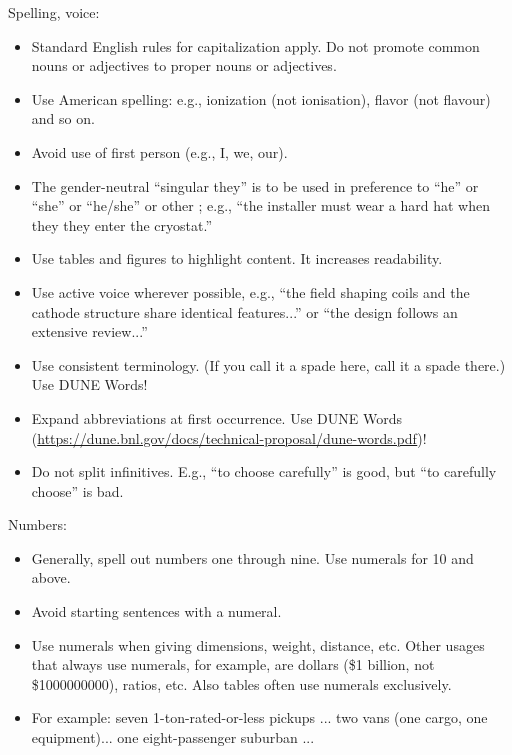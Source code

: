 Spelling, voice:
\begin{itemize}
\item Standard English rules for capitalization apply. Do not promote common nouns or adjectives to proper nouns or adjectives.
\item Use American spelling: e.g., ionization (not ionisation), flavor (not flavour) and so on.
\item Avoid use of first person (e.g., I, we, our). 
\item The gender-neutral ``singular they'' is to be used in preference to ``he'' or ``she'' or ``he/she'' or other ; e.g., ``the installer must wear a hard hat when they they enter the cryostat.''
\item Use tables and figures to highlight content. It increases readability.
\item Use active voice wherever possible, e.g., ``the field shaping coils and the cathode structure share identical features...'' or ``the design follows  an extensive review...''
\item Use consistent terminology. (If you call it a spade here, call it a spade there.) Use DUNE Words!
\item Expand abbreviations at first occurrence. Use DUNE Words (\url{https://dune.bnl.gov/docs/technical-proposal/dune-words.pdf})!
\item Do not split infinitives. E.g., ``to choose carefully'' is good, but ``to carefully choose'' is bad.
\end{itemize}

Numbers:
\begin{itemize}
\item Generally, spell out numbers one through nine. Use numerals for \num{10} and above.
\item Avoid starting sentences with a numeral.
\item Use numerals when giving dimensions, weight, distance, etc. Other usages that always use numerals, for example, are dollars (\$1 billion, not \$\num{1000000000}), ratios, etc. Also tables often use numerals exclusively.
\item For example: seven 1-ton-rated-or-less pickups ... two vans (one cargo, one equipment)... one eight-passenger suburban ...
\end{itemize}


